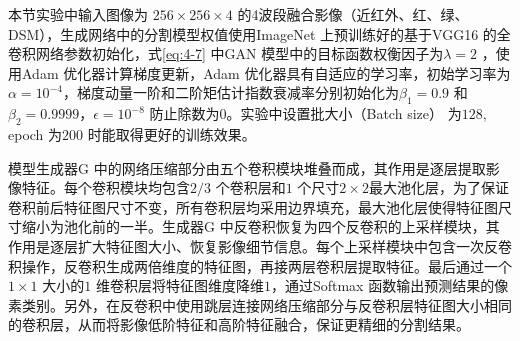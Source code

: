 本节实验中输入图像为 $256\times 256\times 4$ 的4波段融合影像（近红外、红、绿、DSM），生成网络中的分割模型权值使用ImageNet 上预训练好的基于VGG16 的全卷积网络参数初始化，式\ref{eq:4-7} 中GAN 模型中的目标函数权衡因子为$\lambda = 2$ ，使用Adam \cite{kingma2014adam} 优化器计算梯度更新，Adam 优化器具有自适应的学习率，初始学习率为 $\alpha = 10^{-4}$，梯度动量一阶和二阶矩估计指数衰减率分别初始化为$\beta_1 = 0.9$ 和$\beta_2 = 0.9999$，$\epsilon = 10^{-8}$ 防止除数为$0$。实验中设置批大小（Batch size） 为$128$, epoch 为$200$ 时能取得更好的训练效果。

模型生成器G 中的网络压缩部分由五个卷积模块堆叠而成，其作用是逐层提取影像特征。每个卷积模块均包含$2/3$ 个卷积层和$1$ 个尺寸$2\times 2$最大池化层，为了保证卷积前后特征图尺寸不变，所有卷积层均采用边界填充，最大池化层使得特征图尺寸缩小为池化前的一半。生成器G 中反卷积恢复为四个反卷积的上采样模块，其作用是逐层扩大特征图大小、恢复影像细节信息。每个上采样模块中包含一次反卷积操作，反卷积生成两倍维度的特征图，再接两层卷积层提取特征。最后通过一个$1\times 1$ 大小的$1$ 维卷积层将特征图维度降维$1$，通过Softmax 函数输出预测结果的像素类别。另外，在反卷积中使用跳层连接网络压缩部分与反卷积层特征图大小相同的卷积层，从而将影像低阶特征和高阶特征融合，保证更精细的分割结果。

